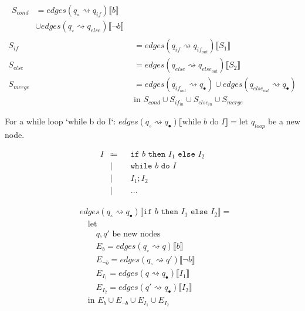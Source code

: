 \begin{align}
    \begin{split}
        S_{cond} &= edges(q_\circ \rightsquigarrow q_{if})\llbracket b \rrbracket \\
        & \cup edges(q_\circ \rightsquigarrow q_{else})\llbracket \neg b \rrbracket
    \end{split} \\
    S_{if} &= edges(q_{if} \rightsquigarrow q_{if_{out}})\llbracket S_1 \rrbracket \\
    S_{else} &= edges(q_{else} \rightsquigarrow q_{else_{out}})\llbracket S_2 \rrbracket \\
    S_{merge} &= edges(q_{if_{out}} \rightsquigarrow q_{\bullet}) \cup edges(q_{else_{out}} \rightsquigarrow q_{\bullet}) \\
    &\text{in } S_{cond} \cup S_{if_{in}} \cup S_{else_{in}} \cup S_{merge}
\end{align}

For a while loop `while b do I`:
$edges(q_{\circ} \rightsquigarrow q_{\bullet})\llbracket \text{while } b \text{ do } I \rrbracket = \text{let } q_{loop}$ be a new node.


\begin{align}
    I &\Coloneqq & &\texttt{if } b \texttt{ then } I_1 \texttt{ else } I_2 \\
      &\mid      & &\texttt{while } b \texttt{ do } I \\
      &\mid      & &I_1; I_2 \\
      &\mid      & &\dots
\end{align}

\begin{equation}
\begin{split}
    &edges(q_\circ \rightsquigarrow q_\bullet) \llbracket \texttt{if } b \texttt{ then } I_1 \texttt{ else } I_2 \rrbracket = \\
    &\quad \text{let } \\
    &\quad\quad q, q' \text{ be new nodes} \\
    &\quad\quad E_{b} = edges(q_\circ \rightsquigarrow q) \llbracket b \rrbracket \\
    &\quad\quad E_{\neg b} = edges(q_\circ \rightsquigarrow q') \llbracket \neg b \rrbracket \\
    &\quad\quad E_{I_1}= edges(q \rightsquigarrow q_\bullet) \llbracket I_1 \rrbracket \\
    &\quad\quad E_{I_2}= edges(q' \rightsquigarrow q_\bullet) \llbracket I_2 \rrbracket \\
    &\quad \text{in } E_{b} \cup E_{\neg b} \cup E_{I_1} \cup E_{I_2}
\end{split}\label{eq:equation14}
\end{equation}

